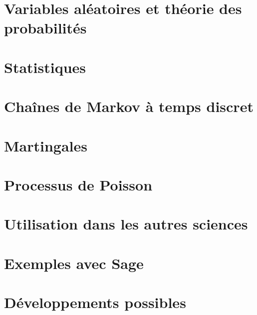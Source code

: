 \chapter{Variables aléatoires et théorie des probabilités}




\chapter{Statistiques}


\chapter{Chaînes de Markov à temps discret}


\chapter{Martingales}


\chapter{Processus de Poisson}


\chapter{Utilisation dans les autres sciences}



\chapter{Exemples avec Sage}


\chapter{Développements possibles}






\emptyInputPath
{}
 
